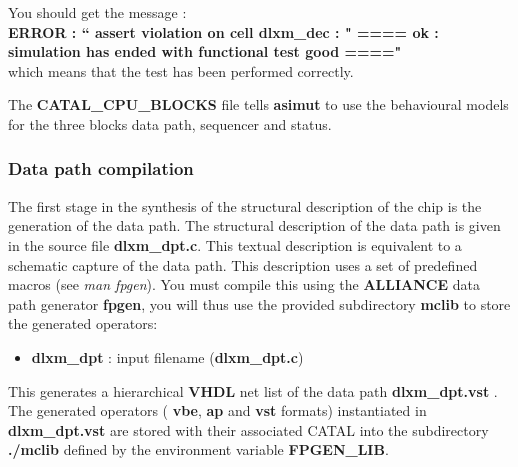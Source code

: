 You should get the message : \\
{\bf ERROR : `` assert violation on cell dlxm\_dec : " ==== ok :
simulation has ended with functional test good ===="}\\
which means that the test has been performed correctly.

The {\bf CATAL\_CPU\_BLOCKS} file tells {\bf asimut} to use the behavioural models for the three blocks data path, sequencer and status.


    		\subsubsection{Data path compilation}

The first stage in the synthesis of the structural description of the chip is the generation of the data path. The structural description of the data path is given in the source file {\bf dlxm\_dpt.c}.
This textual description is equivalent to a schematic capture of the data path.
This description uses a set of predefined macros (see {\em man fpgen}).
 You must compile this using the {\bf ALLIANCE} data path generator
 {\bf fpgen},
 you will thus use the provided subdirectory {\bf mclib} to store the
 generated operators:


\begin{itemize}
\item
{\bf dlxm\_dpt} : input filename ({\bf dlxm\_dpt.c})
\end{itemize}

This generates a hierarchical {\bf VHDL}  net list of the
data path {\bf dlxm\_dpt.vst} . The generated operators ({\bf
vbe}, {\bf ap} and {\bf vst} formats) instantiated in {\bf
dlxm\_dpt.vst} are stored 
with their associated CATAL into
the subdirectory {\bf ./mclib} defined by 
the environment variable {\bf FPGEN\_LIB}.


